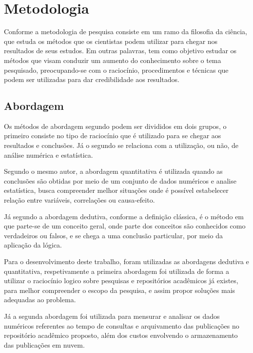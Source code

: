 \section{Metodologia} \label{sec:Methodology}

Conforme \citep[p. 15]{LOVATO:metodologia} a metodologia de pesquisa
consiste em um ramo da filosofia da ciência, que estuda os métodos que
os cientistas podem utilizar para chegar nos resultados de seus estudos.
Em outras palavras, tem como objetivo estudar os métodos que visam
conduzir um aumento do conhecimento sobre o tema pesquisado, preocupando-se
com o raciocínio, procedimentos e técnicas que podem ser utilizadas para
dar credibilidade aos resultados.

\subsection{Abordagem}

Os métodos de abordagem segundo \citep[p. 29]{LOVATO:metodologia} podem ser
divididos em dois grupos, o primeiro consiste no tipo de raciocínio que
é utilizado para se chegar aos resultados e conclusões. Já o segundo
se relaciona com a utilização, ou não, de análise numérica e estatística.

Segundo o mesmo autor, a abordagem quantitativa é utilizada quando
as conclusões são obtidas por meio de um conjunto de dados numéricos
e analise estatística, busca compreender melhor situações onde é possível
estabelecer relação entre variáveis, correlações ou causa-efeito.

Já segundo \cite{GIL:metodologia} a abordagem dedutiva, conforme a definição clássica,
é o método em que parte-se de um conceito geral, onde parte dos
conceitos são conhecidos como verdadeiros ou falsos, e se chega
a uma conclusão particular, por meio da aplicação da lógica.

Para o desenvolvimento deste trabalho, foram utilizadas as abordagens
dedutiva e quantitativa, respetivamente a primeira abordagem foi utilizada
de forma a utilizar o raciocínio logico sobre pesquisas e repositórios
acadêmicos já existes, para melhor compreender o escopo da pesquisa,
e assim propor soluções mais adequadas ao problema.

Já a segunda abordagem foi utilizada para mensurar e analisar
os dados numéricos referentes ao tempo de consultas e arquivamento
das publicações no repositório acadêmico proposto, além dos
custos envolvendo o armazenamento das publicações em nuvem.

